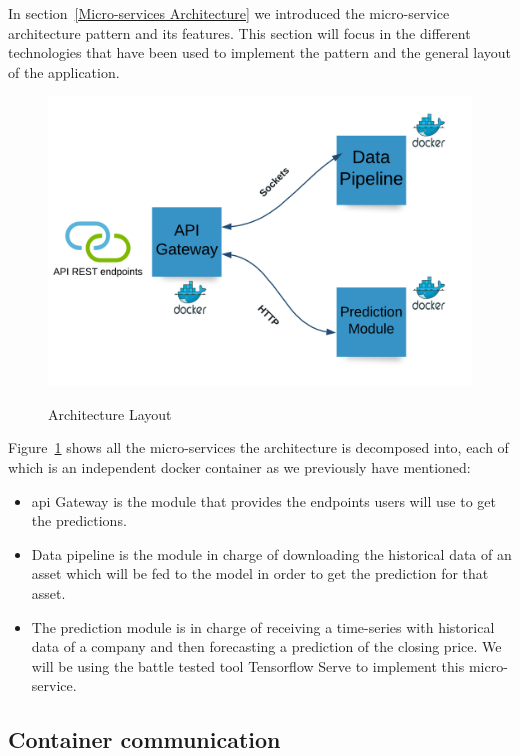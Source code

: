 In section~\ref{Micro-services Architecture} we introduced the micro-service architecture pattern and its features. This section will focus in the different technologies that have been used to implement the pattern and the general layout of the application.

\begin{figure}[h]
    \centering
    \caption{Architecture Layout}
    \includegraphics[width=\textwidth]{figures/architecture.png}
    \label{fig:architecture-layout}
\end{figure}

Figure~\ref{fig:architecture-layout} shows all the micro-services the architecture is decomposed into, each of which is an independent docker container as we previously have mentioned:

\begin{itemize}
    \item \gls{api} Gateway is the module that provides the endpoints users will use to get the predictions.
    \item Data pipeline is the module in charge of downloading the historical data of an asset which will be fed to the model in order to get the prediction for that asset.
    \item The prediction module is in charge of receiving a time-series with historical data of a company and then forecasting a prediction of the closing price. We will be using the battle tested tool Tensorflow Serve to implement this micro-service.
\end{itemize}

\subsection{Container communication}
\label{Container communication}


